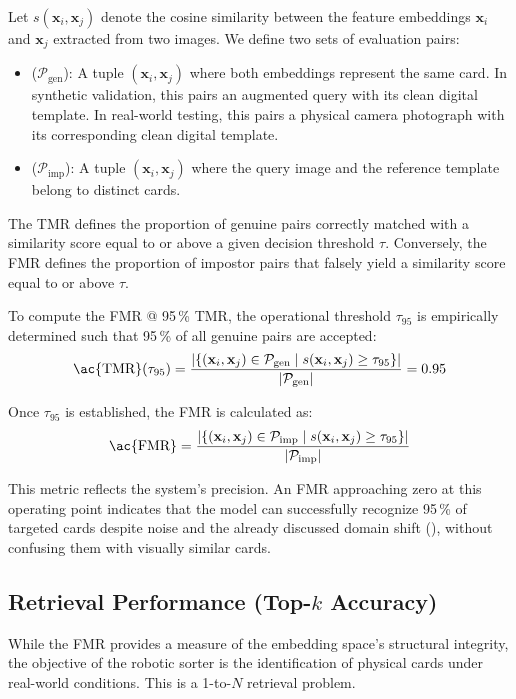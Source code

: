 Let $s(\mathbf{x}_i, \mathbf{x}_j)$ denote the cosine similarity between the feature embeddings $\mathbf{x}_i$ and $\mathbf{x}_j$ extracted from two images. We define two sets of evaluation pairs:
\begin{itemize}
    \item {} ($\mathcal{P}_{\text{gen}}$): A tuple $(\mathbf{x}_i, \mathbf{x}_j)$ where both embeddings represent the same card. In synthetic validation, this pairs an augmented query with its clean digital template. In real-world testing, this pairs a physical camera photograph with its corresponding clean digital template.
    \item {} ($\mathcal{P}_{\text{imp}}$): A tuple $(\mathbf{x}_i, \mathbf{x}_j)$ where the query image and the reference template belong to distinct cards.
\end{itemize}

The \ac{TMR} defines the proportion of genuine pairs correctly matched with a similarity score equal to or above a given decision threshold $\tau$. Conversely, the \ac{FMR} defines the proportion of impostor pairs that falsely yield a similarity score equal to or above $\tau$.

To compute the \ac{FMR} @ 95\,\% \ac{TMR}, the operational threshold $\tau_{95}$ is empirically determined such that 95\,\% of all genuine pairs are accepted:
\begin{equation}
    \text{\ac{TMR}}(\tau_{95}) = \frac{|\{ (\mathbf{x}_i, \mathbf{x}_j) \in \mathcal{P}_{\text{gen}} \mid s(\mathbf{x}_i, \mathbf{x}_j) \geq \tau_{95} \}|}{|\mathcal{P}_{\text{gen}}|} = 0.95
\end{equation}

Once $\tau_{95}$ is established, the \ac{FMR} is calculated as:
\begin{equation}
    \text{\ac{FMR}} = \frac{|\{ (\mathbf{x}_i, \mathbf{x}_j) \in \mathcal{P}_{\text{imp}} \mid s(\mathbf{x}_i, \mathbf{x}_j) \geq \tau_{95} \}|}{|\mathcal{P}_{\text{imp}}|}
\end{equation}

This metric reflects the system's precision. An \ac{FMR} approaching zero at this operating point indicates that the model can successfully recognize 95\,\% of targeted cards despite noise and the already discussed domain shift (), without confusing them with visually similar cards.

\subsection{Retrieval Performance (Top-\texorpdfstring{$k$}{k} Accuracy)}
While the \ac{FMR} provides a measure of the embedding space's structural integrity, the objective of the robotic sorter is the identification of physical cards under real-world conditions. This is a 1-to-$N$ retrieval problem.

